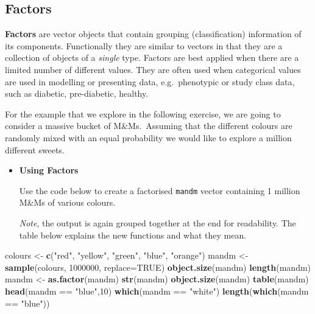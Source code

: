 \documentclass[a4paper]{book}
\newenvironment{Shaded}{\begin{snugshade}}{\end{snugshade}}
\newcommand{\KeywordTok}[1]{\textcolor[rgb]{0.13,0.29,0.53}{\textbf{{#1}}}}
\newcommand{\DataTypeTok}[1]{\textcolor[rgb]{0.13,0.29,0.53}{{#1}}}
\newcommand{\DecValTok}[1]{\textcolor[rgb]{0.00,0.00,0.81}{{#1}}}
\newcommand{\StringTok}[1]{\textcolor[rgb]{0.31,0.60,0.02}{{#1}}}
\newcommand{\OtherTok}[1]{\textcolor[rgb]{0.56,0.35,0.01}{{#1}}}
\newcommand{\NormalTok}[1]{{#1}}
\renewenvironment{Shaded}
{\vspace{1.5em}\begin{leftbar}\begin{snugshade}}
{\end{snugshade}\end{leftbar}\vspace{3pt}}
\newenvironment{rmdblock}[1]
  {\vspace{1.5em}\begin{shaded*}
  \begin{itemize}
  \renewcommand{\labelitemi}{
    \raisebox{-.7\height}[0pt][0pt]{
      {\setkeys{Gin}{width=3em,keepaspectratio}\texttt{[image: images/\#1]}}
    }
  }
  \item
  }
  {
  \end{itemize}
  \end{shaded*}
  }
\newenvironment{rmdexercise}
  {\begin{rmdblock}{exercise}}
  {\end{rmdblock}}
\begin{document}
\subsection{Factors}\label{factors}

\textbf{Factors} are vector objects that contain grouping
(classification) information of its components. Functionally they are
similar to vectors in that they are a collection of objects of a
\emph{single} type. Factors are best applied when there are a limited
number of different values. They are often used when categorical values
are used in modelling or presenting data, e.g.~phenotypic or study class
data, such as diabetic, pre-diabetic, healthy.

For the example that we explore in the following exercise, we are going
to consider a massive bucket of M\&Ms.~Assuming that the different
colours are randomly mixed with an equal probability we would like to
explore a million different sweets.

\begin{rmdexercise}
\textbf{Using Factors}

Use the code below to create a factorised \texttt{mandm} vector
containing 1 million M\&Ms of various colours.

\emph{Note}, the output is again grouped together at the end for
readability. The table below explains the new functions and what they
mean.
\end{rmdexercise}

\begin{Shaded}
\begin{Highlighting}[]
\NormalTok{colours <-}\StringTok{ }\KeywordTok{c}\NormalTok{(}\StringTok{"red"}\NormalTok{, }\StringTok{"yellow"}\NormalTok{, }\StringTok{"green"}\NormalTok{, }\StringTok{"blue"}\NormalTok{, }\StringTok{"orange"}\NormalTok{)}
\NormalTok{mandm <-}\StringTok{ }\KeywordTok{sample}\NormalTok{(colours, }\DecValTok{1000000}\NormalTok{, }\DataTypeTok{replace=}\OtherTok{TRUE}\NormalTok{)}
\KeywordTok{object.size}\NormalTok{(mandm)}
\KeywordTok{length}\NormalTok{(mandm)}
\NormalTok{mandm <-}\StringTok{ }\KeywordTok{as.factor}\NormalTok{(mandm)}
\KeywordTok{str}\NormalTok{(mandm)}
\KeywordTok{object.size}\NormalTok{(mandm)}
\KeywordTok{table}\NormalTok{(mandm)}
\KeywordTok{head}\NormalTok{(mandm ==}\StringTok{ "blue"}\NormalTok{,}\DecValTok{10}\NormalTok{)}
\KeywordTok{which}\NormalTok{(mandm ==}\StringTok{ "white"}\NormalTok{)}
\KeywordTok{length}\NormalTok{(}\KeywordTok{which}\NormalTok{(mandm ==}\StringTok{ "blue"}\NormalTok{))}
\end{Highlighting}
\end{Shaded}
\end{document}
